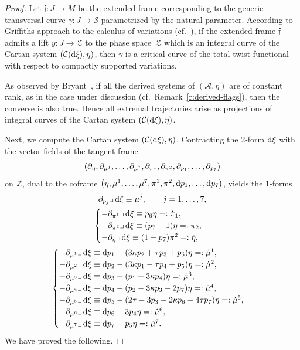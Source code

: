 \documentclass[10pt,a4paper]{amsart}
\numberwithin{equation}{section}
\def\S{\mathcal{S}}
\def\S{\mathcal{S}}
\begin{document}
\begin{proof}
Let $\mathfrak{f}\colon J \to M$ be the extended frame corresponding to the generic transversal curve
$\gamma\colon J \to \S$ parametrized by the natural parameter.
According to Griffiths approach to the calculus of variations (cf.~\cite{Bryant1987, Gr, Hsu, GM}),
if the extended frame $\mathfrak{f}$
admits a lift $y\colon J \to \mathcal{Z}$ to the phase space~$\mathcal{Z}$ which is an integral curve of the Cartan system $(\mathcal{C}({\rm d}\xi), \eta)$,
then $\gamma$ is a critical curve of the total twist functional with respect to compactly supported variations.

As observed by
Bryant~\cite{Bryant1987}, if all the derived systems
of $(\mathcal{A},\eta)$ are of
constant rank, as in the case under discussion (cf.\ Remark~\ref{r:derived-flags}), then the converse is also true.
Hence all extremal trajectories arise as projections of integral curves of the Cartan
system $(\mathcal{C}({\rm d}\xi), \eta)$.

Next, we compute the Cartan system $(\mathcal{C}({\rm d}\xi), \eta)$.
Contracting the 2-form ${\rm d}\xi$ with the vector fields of the tangent frame
\[
 (\partial_\eta,\partial_{ \mu^1},\dots,\partial_{\mu^7 },
 \partial_{ \pi^1},\partial_{ \pi^2},\partial_{ p_1},\mathellipsis,\partial_{ p_7})
\]
on $\mathcal{Z}$, dual to the coframe $\big(\eta, \mu^1,\dots,\mu^7,\pi^1,\pi^2,{\rm d}p_1,\dots,{\rm d}p_7\big)$,
yields the 1-forms
\begin{gather}%
\partial_{ p_j}{\lrcorner} \,{\rm d}\xi\equiv\mu^j, \qquad j=1,\dots,7, \nonumber
\\
\label{C-system2}\begin{cases}
-\partial_{ \pi^1}\lrcorner \,{\rm d}\xi\equiv p_6\eta = :\dot\pi_1,\\
-\partial_{ \pi^2}\lrcorner\,{\rm d}\xi\equiv (p_7 -1)\eta =:\dot\pi_2,\\
-\partial_\eta\lrcorner\,{\rm d}\xi\equiv (1 - p_7)\pi^2 =:\dot\eta,
\end{cases}
\\ \nonumber %
\begin{cases}
-\partial_{ \mu^1}\lrcorner\,{\rm d}\xi\equiv {\rm d}p_1 + (3\kappa p_2+\tau p_3+p_6)\eta =: \dot\mu^1,\\
-\partial_{ \mu^2}\lrcorner\,{\rm d}\xi\equiv {\rm d}p_2 - (3\kappa p_1-\tau p_4+p_5)\eta =: \dot\mu^2,\\
-\partial_{ \mu^3}\lrcorner\,{\rm d}\xi\equiv {\rm d}p_3 + (p_1+3\kappa p_4)\eta =: \dot\mu^3,\\
-\partial_{ \mu^4}\lrcorner\,{\rm d}\xi\equiv {\rm d}p_4 + (p_2-3\kappa p_3-2p_7)\eta =:\dot\mu^4,\\
-\partial_{ \mu^5}\lrcorner\,{\rm d}\xi\equiv {\rm d}p_5 - (2\tau - 3p_3- 2\kappa p_6 - 4\tau p_7)\eta=: \dot\mu^5,\\
-\partial_{ \mu^6}\lrcorner\,{\rm d}\xi\equiv {\rm d}p_6-3p_4\eta = : \dot\mu^6,\\
-\partial_{ \mu^7}\lrcorner\,{\rm d}\xi\equiv {\rm d}p_7 + p_5\eta =: \dot\mu^7.
\end{cases}
\end{gather}
We have proved the following.


\end{proof}
\end{document}
